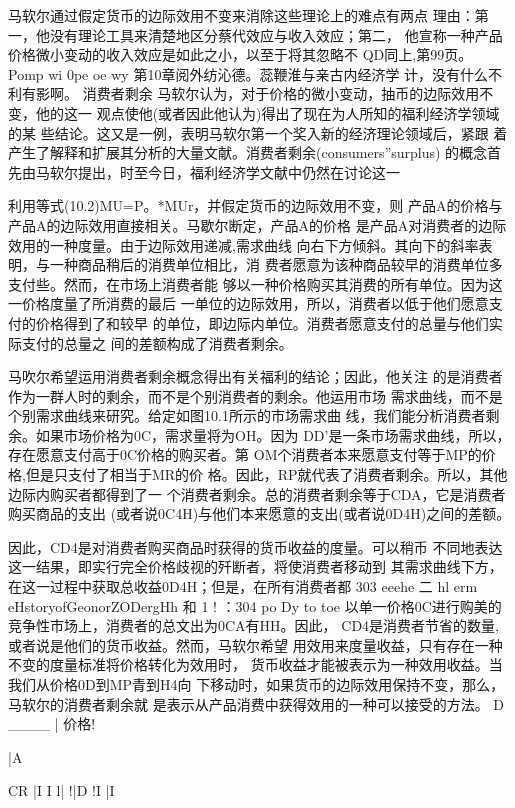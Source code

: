 马软尔通过假定货币的边际效用不变来消除这些理论上的难点有两点
理由：第一，他没有理论工具来清楚地区分蔡代效应与收入效应；第二，
他宣称一种产品价格微小变动的收入效应是如此之小，以至于将其忽略不
QD同上,第99页。
Pomp
wi
0pe
oe
wy
第10章阅外纺沁德。蕊鞭淮与亲古内经济学
计，没有什么不利有影啊。
消费者剩余
马软尔认为，对于价格的微小变动，抽币的边际效用不变，他的这一
观点使他(或者因此他认为)得出了现在为人所知的福利经济学领域的某
些结论。这又是一例，表明马软尔第一个奖入新的经济理论领域后，紧跟
着产生了解释和扩展其分析的大量文献。消费者剩余(consumers”surplus)
的概念首先由马软尔提出，时至今日，福利经济学文献中仍然在讨论这一

利用等式(10.2)MU=P。*MUr，并假定货币的边际效用不变，则
产品A的价格与产品A的边际效用直接相关。马歇尔断定，产品A的价格
是产品A对消费者的边际效用的一种度量。由于边际效用递减,需求曲线
向右下方倾斜。其向下的斜率表明，与一种商品稍后的消费单位相比，消
费者愿意为该种商品较早的消费单位多支付些。然而，在市场上消费者能
够以一种价格购买其消费的所有单位。因为这一价格度量了所消费的最后
一单位的边际效用，所以，消费者以低于他们愿意支付的价格得到了和较早
的单位，即边际内单位。消费者愿意支付的总量与他们实际支付的总量之
间的差额构成了消费者剩余。

马吹尔希望运用消费者剩余概念得出有关福利的结论；因此，他关注
的是消费者作为一群人时的剩余，而不是个别消费者的剩余。他运用市场
需求曲线，而不是个别需求曲线来研究。给定如图10.1所示的市场需求曲
线，我们能分析消费者剩余。如果市场价格为0C，需求量将为OH。因为
DD'是一条市场需求曲线，所以，存在愿意支付高于0C价格的购买者。第
OM个消费者本来愿意支付等于MP的价格,但是只支付了相当于MR的价
格。因此，RP就代表了消费者剩余。所以，其他边际内购买者都得到了一
个消费者剩余。总的消费者剩余等于CDA，它是消费者购买商品的支出
(或者说0C4H)与他们本来愿意的支出(或者说0D4H)之间的差额。

因此，CD4是对消费者购买商品时获得的货币收益的度量。可以稍币
不同地表达这一结果，即实行完全价格歧视的歼断者，将使消费者移动到
其需求曲线下方，在这一过程中获取总收益0D4H；但是，在所有消费者都
303
eeehe
二
hl
erm
eHstoryofGeonorZODergHh
和
1
!
：304
po
Dy
to
toe
以单一价格0C进行购美的竞争性市场上，消费者的总文出为0CA有HH。因此，
CD4是消费者节省的数量,或者说是他们的货币收益。然而，马软尔希望
用效用来度量收益，只有存在一种不变的度量标准将价格转化为效用时，
货币收益才能被表示为一种效用收益。当我们从价格0D到MP青到H4向
下移动时，如果货币的边际效用保持不变，那么，马软尔的消费者剩余就
是表示从产品消费中获得效用的一种可以接受的方法。
D
____\Pr
|
价格!

|A

CR
|I
I
l|
!|D
!I
|I

